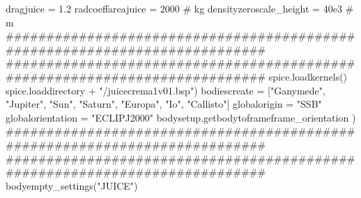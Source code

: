 {}
\markdownRendererSectionEnd \markdownRendererSectionBegin
{}\markdownRendererInterblockSeparator
{}
\markdownRendererSectionEnd \markdownRendererSectionBegin
{}\markdownRendererInterblockSeparator
{}dragjuice = 1.2 radcoeffareajuice = 2000 # kg\markdownRendererInterblockSeparator
{}
\markdownRendererSectionEnd \markdownRendererSectionBegin
{}\markdownRendererInterblockSeparator
{}densityzeroscale_height = 40e3 # m\markdownRendererInterblockSeparator
{}###########################################################################\markdownRendererInterblockSeparator
{}
\markdownRendererSectionEnd \markdownRendererSectionBegin
{}\markdownRendererInterblockSeparator
{}###########################################################################\markdownRendererInterblockSeparator
{}
\markdownRendererSectionEnd \markdownRendererSectionBegin
{}\markdownRendererInterblockSeparator
{}spice.loadkernels() spice.loaddirectory + "/juicecrema1v01.bsp")\markdownRendererInterblockSeparator
{}
\markdownRendererSectionEnd \markdownRendererSectionBegin
{}\markdownRendererInterblockSeparator
{}bodiescreate = ["Ganymede", "Jupiter", "Sun", "Saturn", "Europa", "Io", "Callisto"] globalorigin = "SSB" globalorientation = "ECLIPJ2000" bodysetup.getbodytoframeframe_orientation )\markdownRendererInterblockSeparator
{}###########################################################################\markdownRendererInterblockSeparator
{}
\markdownRendererSectionEnd \markdownRendererSectionBegin
{}\markdownRendererInterblockSeparator
{}########################################################################### bodyempty_settings("JUICE")\markdownRendererInterblockSeparator
